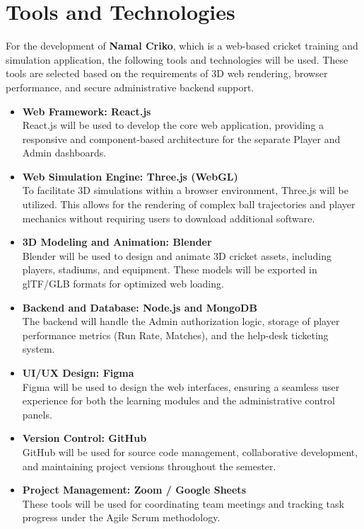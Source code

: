 \documentclass[12pt,a4paper]{article}
\begin{document}
\section{Tools and Technologies}
For the development of \textbf{Namal Criko}, which is a web-based cricket training and simulation application, the following tools and technologies will be used. These tools are selected based on the requirements of 3D web rendering, browser performance, and secure administrative backend support.

\begin{itemize}

\item \textbf{Web Framework: React.js} \\
React.js will be used to develop the core web application, providing a responsive and component-based architecture for the separate Player and Admin dashboards.

\item \textbf{Web Simulation Engine: Three.js (WebGL)} \\
To facilitate 3D simulations within a browser environment, Three.js will be utilized. This allows for the rendering of complex ball trajectories and player mechanics without requiring users to download additional software.

\item \textbf{3D Modeling and Animation: Blender} \\
Blender will be used to design and animate 3D cricket assets, including players, stadiums, and equipment. These models will be exported in glTF/GLB formats for optimized web loading.

\item \textbf{Backend and Database: Node.js and MongoDB} \\
The backend will handle the Admin authorization logic, storage of player performance metrics (Run Rate, Matches), and the help-desk ticketing system.

\item \textbf{UI/UX Design: Figma} \\
Figma will be used to design the web interfaces, ensuring a seamless user experience for both the learning modules and the administrative control panels.

\item \textbf{Version Control: GitHub} \\
GitHub will be used for source code management, collaborative development, and maintaining project versions throughout the semester.

\item \textbf{Project Management: Zoom / Google Sheets} \\
These tools will be used for coordinating team meetings and tracking task progress under the Agile Scrum methodology.

\end{itemize}
\end{document}
